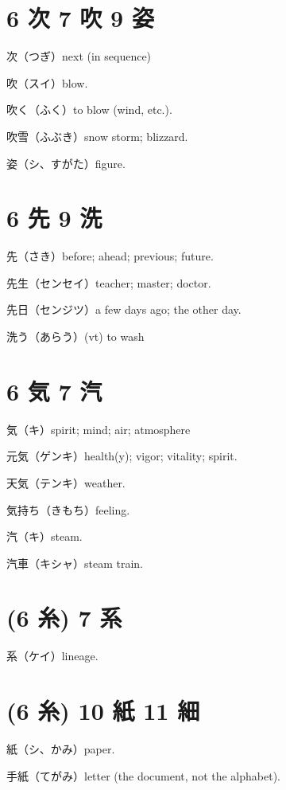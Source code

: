 \section{6 次 7 吹 9 姿}

次（つぎ）next (in sequence)

吹（スイ）blow.

吹く（ふく）to blow (wind, etc.).

吹雪（ふぶき）snow storm; blizzard.

姿（シ、すがた）figure.


\section{6 先 9 洗}

先（さき）before; ahead; previous; future.

先生（センセイ）teacher; master; doctor.

先日（センジツ）a few days ago; the other day.

洗う（あらう）(vt) to wash

\section{6 気 7 汽}

気（キ）spirit; mind; air; atmosphere

元気（ゲンキ）health(y); vigor; vitality; spirit.

天気（テンキ）weather.

気持ち（きもち）feeling.

汽（キ）steam.

汽車（キシャ）steam train.

\section{(6 糸) 7 系}

系（ケイ）lineage.

\section{(6 糸) 10 紙 11 細}

紙（シ、かみ）paper.

手紙（てがみ）letter (the document, not the alphabet).

